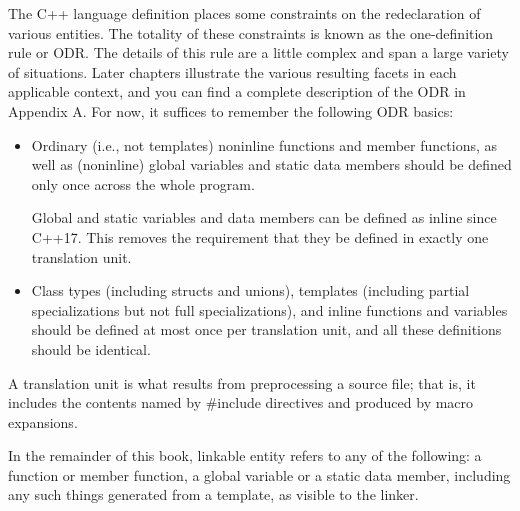 The C++ language definition places some constraints on the redeclaration of various entities. The totality of these constraints is known as the one-definition rule or ODR. The details of this rule are a little complex and span a large variety of situations. Later chapters illustrate the various resulting facets in each applicable context, and you can find a complete description of the ODR in Appendix A. For now, it suffices to remember the following ODR basics:

\begin{itemize}
\item 
Ordinary (i.e., not templates) noninline functions and member functions, as well as (noninline) global variables and static data members should be defined only once across the whole program.

\begin{tcolorbox}[colback=webgreen!5!white,colframe=webgreen!75!black]
\hspace*{0.75cm}Global and static variables and data members can be defined as inline since C++17. This removes the requirement that they be defined in exactly one translation unit.
\end{tcolorbox}

\item 
Class types (including structs and unions), templates (including partial specializations but not full specializations), and inline functions and variables should be defined at most once per translation unit, and all these definitions should be identical.
\end{itemize}

A translation unit is what results from preprocessing a source file; that is, it includes the contents named by \#include directives and produced by macro expansions.

In the remainder of this book, linkable entity refers to any of the following: a function or member function, a global variable or a static data member, including any such things generated from a template, as visible to the linker.




































